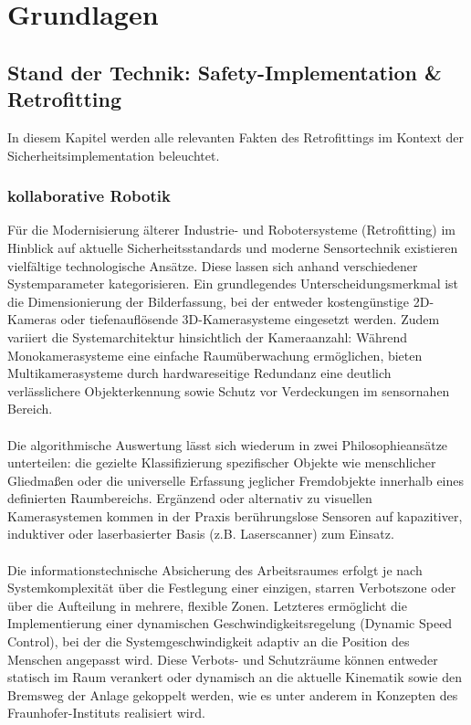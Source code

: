 \chapter{Grundlagen}
\label{Grundlagen}

\section{Stand der Technik: Safety-Implementation \& Retrofitting}
\label{kap:safetyimplementation}
In diesem Kapitel werden alle relevanten Fakten des Retrofittings im Kontext der Sicherheitsimplementation beleuchtet.

\subsection{kollaborative Robotik}
Für die Modernisierung älterer Industrie- und Robotersysteme (Retrofitting) im Hinblick auf aktuelle Sicherheitsstandards und moderne Sensortechnik existieren vielfältige technologische Ansätze. Diese lassen sich anhand verschiedener Systemparameter kategorisieren. Ein grundlegendes Unterscheidungsmerkmal ist die Dimensionierung der Bilderfassung, bei der entweder kostengünstige 2D-Kameras oder tiefenauflösende 3D-Kamerasysteme eingesetzt werden. Zudem variiert die Systemarchitektur hinsichtlich der Kameraanzahl: Während Monokamerasysteme eine einfache Raumüberwachung ermöglichen, bieten Multikamerasysteme durch hardwareseitige Redundanz eine deutlich verlässlichere Objekterkennung sowie Schutz vor Verdeckungen im sensornahen Bereich.
\\
\\Die algorithmische Auswertung lässt sich wiederum in zwei Philosophieansätze unterteilen: die gezielte Klassifizierung spezifischer Objekte wie menschlicher Gliedmaßen oder die universelle Erfassung jeglicher Fremdobjekte innerhalb eines definierten Raumbereichs. Ergänzend oder alternativ zu visuellen Kamerasystemen kommen in der Praxis berührungslose Sensoren auf kapazitiver, induktiver oder laserbasierter Basis (z.B. Laserscanner) zum Einsatz.
\\
\\Die informationstechnische Absicherung des Arbeitsraumes erfolgt je nach Systemkomplexität über die Festlegung einer einzigen, starren Verbotszone oder über die Aufteilung in mehrere, flexible Zonen. Letzteres ermöglicht die Implementierung einer dynamischen Geschwindigkeitsregelung (Dynamic Speed Control), bei der die Systemgeschwindigkeit adaptiv an die Position des Menschen angepasst wird. Diese Verbots- und Schutzräume können entweder statisch im Raum verankert oder dynamisch an die aktuelle Kinematik sowie den Bremsweg der Anlage gekoppelt werden, wie es unter anderem in Konzepten des Fraunhofer-Instituts \cite{fraunhoferiff2026proj} realisiert wird.
